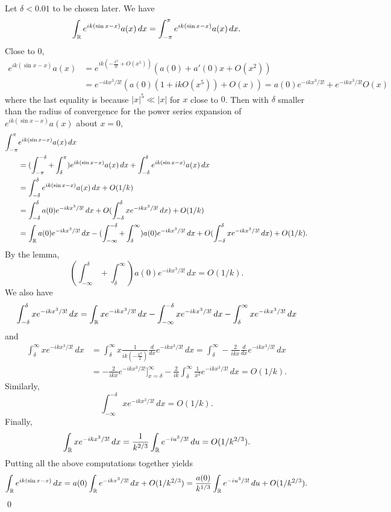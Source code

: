 Let $\delta < 0.01$ to be chosen later. We have
$$\int_{\mathbb{R}}e^{ik(\sin x - x)}a(x)\, dx = \int_{-\pi}^{\pi}e^{ik(\sin x - x)}a(x)\, dx.$$
Close to $0$,
\begin{align*}
e^{ik(\sin x - x)}a(x) &= e^{ik(-\frac{x^{3}}{3!} + O(x^{5}))}(a(0) + a'(0)x + O(x^{2}))\\
& = e^{-ikx^{3}/3!}(a(0)(1 + ikO(x^{5})) + O(x)) = a(0)e^{-ikx^{3}/3!} + e^{-ikx^{3}/3!}O(x)
\end{align*}
where the last equality is because $|x|^{5} \ll |x|$ for $x$ close to $0$.
Then with $\delta$ smaller than the radius of convergence for the power series expansion of $e^{ik(\sin x - x)}a(x)$ about $x = 0$,
\begin{align*}
\int_{-\pi}^{\pi}&e^{ik(\sin x - x)}a(x)\, dx\\
& = (\int_{-\pi}^{-\delta} + \int_{\delta}^{\pi})e^{ik(\sin x - x)}a(x)\, dx + \int_{-\delta}^{\delta}e^{ik(\sin x - x)}a(x)\, dx\\
&=\int_{-\delta}^{\delta}e^{ik(\sin x - x)}a(x)\, dx + O(1/k)\\
&= \int_{-\delta}^{\delta}a(0)e^{-ikx^{3}/3!}\, dx + O(\int_{-\delta}^{\delta}xe^{-ikx^{3}/3!}\, dx) + O(1/k)\\
&= \int_{\mathbb{R}}a(0)e^{-ikx^{3}/3!}\, dx - (\int_{-\infty}^{-\delta} + \int_{\delta}^{\infty})a(0)e^{-ikx^{3}/3!}\, dx + O(\int_{-\delta}^{\delta}xe^{-ikx^{3}/3!}\, dx) + O(1/k).
\end{align*}
By the lemma,
$$(\int_{-\infty}^{\delta} + \int_{\delta}^{\infty})a(0)e^{-ikx^{3}/3!}\, dx = O(1/k).$$
We also have
$$\int_{-\delta}^{\delta}xe^{-ikx^{3}/3!}\, dx = \int_{\mathbb{R}}xe^{-ikx^{3}/3!}\, dx - \int_{-\infty}^{-\delta}xe^{-ikx^{3}/3!}\, dx - \int_{\delta}^{\infty}xe^{-ikx^{3}/3!}\, dx$$
and
\begin{align*}
\int_{\delta}^{\infty}xe^{-ikx^{3}/3!}\, dx &= \int_{\delta}^{\infty}x\frac{1}{ik(-\frac{x^{2}}{2})}\frac{d}{dx}e^{-ikx^{3}/3!}\, dx= \int_{\delta}^{\infty}-\frac{2}{ikx}\frac{d}{dx}e^{-ikx^{3}/3!}\, dx\\
& = -\frac{2}{ikx}e^{-ikx^{3}/3!}\bigg]_{x = \delta}^{\infty} - \frac{2}{ik}\int_{\delta}^{\infty}\frac{1}{x^{2}}e^{-ikx^{3}/3!}\, dx = O(1/k).
\end{align*}
Similarly, $$\int_{-\infty}^{-\delta}xe^{-ikx^{3}/3!}\, dx = O(1/k).$$
Finally,
$$\int_{\mathbb{R}}xe^{-ikx^{3}/3!}\, dx = \frac{1}{k^{2/3}}\int_{\mathbb{R}}e^{-iu^{3}/3!}\, du = O(1/k^{2/3}).$$
Putting all the above computations together yields
\begin{align*}
\int_{\mathbb{R}}e^{ik(\sin x - x)}\, dx = a(0)\int_{\mathbb{R}}e^{-ikx^{3}/3!}\, dx + O(1/k^{2/3}) = \frac{a(0)}{k^{1/3}}\int_{\mathbb{R}}e^{-iu^{3}/3!}\, du + O(1/k^{2/3}).
\end{align*}
\hfill\qed

